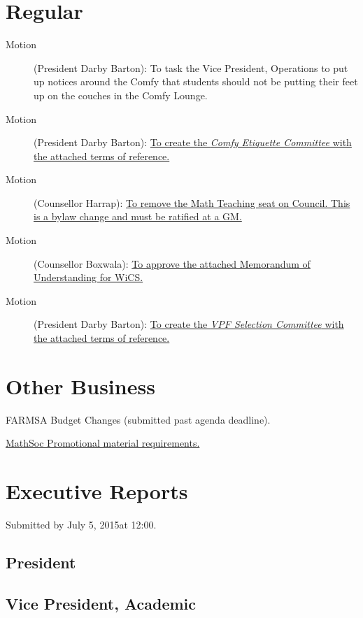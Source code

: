 \documentclass[12pt, letterpaper]{article}
\newcommand{\agendaDate}{July 5, 2015} %
\begin{document}
\section*{Regular}
\begin{description}
	\item[Motion] (President Darby Barton): To task the Vice President, Operations to put up notices around the Comfy that students should not be putting their feet up on the couches in the Comfy Lounge.
	\item[Motion] (President Darby Barton): \hyperref[comfy]{To create the \emph{Comfy Etiquette Committee} with the attached terms of reference.}
	\item[Motion] (Counsellor Harrap): \hyperref[teaching]{To remove the Math Teaching seat on Council. This is a bylaw change and must be ratified at a GM.}
	\item[Motion] (Counsellor Boxwala): \hyperref[wics]{To approve the attached Memorandum of Understanding for WiCS.}
	\item[Motion] (President Darby Barton): \hyperref[vpf]{To create the \emph{VPF Selection Committee} with the attached terms of reference.}
\end{description}
\HRule

\section*{Other Business}
\begin{description}
	\item FARMSA Budget Changes (submitted past agenda deadline).
	\item \hyperref[clubs]{MathSoc Promotional material requirements.}
\end{description}
\HRule

\newpage


\newpage
\section*{Executive Reports}
Submitted by \agendaDate at 12:00.

\subsection*{President}


\subsection*{Vice President, Academic}

\end{document}
